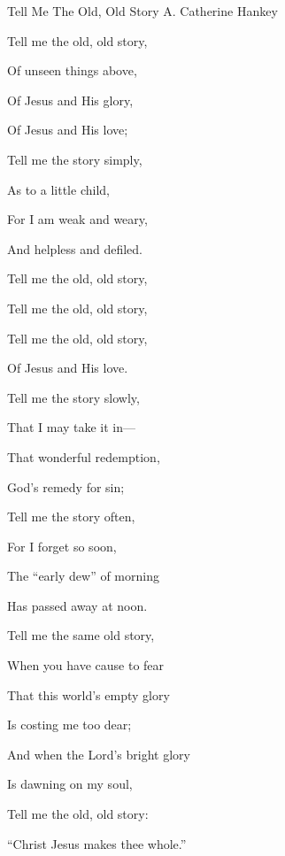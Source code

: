 \documentclass[12pt]{book}
\begin{document}
\begin{song}{Tell Me The Old, Old Story}{}
  {\SBPubDom}
  {A. Catherine Hankey}
  {}
  {}

  \begin{SBVerse}
    Tell me the old, old story,

    Of unseen things above,

    Of Jesus and His glory,

    Of Jesus and His love;

    Tell me the story simply,

    As to a little child,

    For I am weak and weary,

    And helpless and defiled.
  \end{SBVerse}

  \begin{SBOpGroup}
    Tell me the old, old story,

    Tell me the old, old story,

    Tell me the old, old story,

    Of Jesus and His love.
  \end{SBOpGroup}

  \begin{SBVerse}
    Tell me the story slowly,

    That I may take it in---

    That wonderful redemption,

    God's remedy for sin;

    Tell me the story often,

    For I forget so soon,

    The ``early dew'' of morning

    Has passed away at noon.
  \end{SBVerse}

  \begin{SBVerse}
    Tell me the same old story,

    When you have cause to fear

    That this world's empty glory

    Is costing me too dear;

    And when the Lord's bright glory

    Is dawning on my soul,

    Tell me the old, old story:

    ``Christ Jesus makes thee whole.''
  \end{SBVerse}
\end{song}
\end{document}
